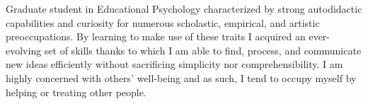 \begin{minipage}[t]{1\linewidth}
	\vspace{0.25cm}
	Graduate student in Educational Psychology characterized by strong autodidactic capabilities and curiosity for numerous scholastic, empirical, and artistic preoccupations. By learning to make use of these traits I acquired an ever-evolving set of skills thanks to which I am able to find, process, and communicate new ideas efficiently without sacrificing simplicity nor comprehensibility. I am highly concerned with others' well-being and as such, I tend to occupy myself by helping or treating other people.
\end{minipage} 
